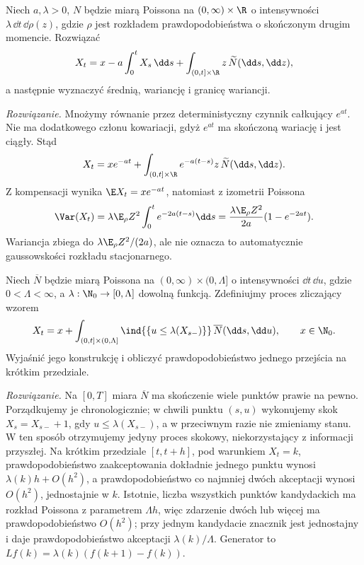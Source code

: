 \begin{zadanie}
Niech $a,\lambda>0$, $N$ będzie miarą Poissona na
$(0,\infty)\times\R$ o intensywności
$\lambda\,\dd t\,\dd\rho(z)$, gdzie $\rho$ jest
rozkładem prawdopodobieństwa o skończonym drugim momencie.
Rozwiązać
\[
 X_t=x-a\int_0^tX_s\,\dd s
 +\int_{(0,t]\times\R}z\,\widetilde N(\dd s,\dd z),
\]
a następnie wyznaczyć średnią, wariancję i granicę wariancji.

\emph{Rozwiązanie.} Mnożymy równanie przez deterministyczny
czynnik całkujący $e^{at}$. Nie ma dodatkowego członu
kowariacji, gdyż $e^{at}$ ma skończoną wariację i jest ciągły.
Stąd
\[
 X_t=xe^{-at}+\int_{(0,t]\times\R}
 e^{-a(t-s)}z\,\widetilde N(\dd s,\dd z).
\]
Z kompensacji wynika $\E X_t=xe^{-at}$, natomiast z
izometrii Poissona
\[
 \Var(X_t)=\lambda\E_\rho Z^2\int_0^te^{-2a(t-s)}\dd s
 =\frac{\lambda\E_\rho Z^2}{2a}(1-e^{-2at}).
\]
Wariancja zbiega do $\lambda\E_\rho Z^2/(2a)$, ale
nie oznacza to automatycznie gaussowskości rozkładu
stacjonarnego.
\end{zadanie}

\begin{zadanie}
Niech $\overline N$ będzie miarą Poissona na
$(0,\infty)\times(0,\Lambda]$ o intensywności
$\dd t\,\dd u$, gdzie $0<\Lambda<\infty$, a
$\lambda:\N_0\to[0,\Lambda]$ dowolną funkcją.
Zdefiniujmy proces zliczający wzorem
\[
 X_t=x+\int_{(0,t]\times(0,\Lambda]}
  \ind{\{u\le\lambda(X_{s-})\}}\,\overline N(\dd s,\dd u),
 \qquad x\in\N_0.
\]
Wyjaśnić jego konstrukcję i obliczyć prawdopodobieństwo
jednego przejścia na krótkim przedziale.

\emph{Rozwiązanie.} Na $[0,T]$ miara $\overline N$ ma
skończenie wiele punktów prawie na pewno. Porządkujemy
je chronologicznie; w chwili punktu $(s,u)$ wykonujemy skok
$X_s=X_{s-}+1$, gdy $u\le\lambda(X_{s-})$, a w przeciwnym
razie nie zmieniamy stanu. W ten sposób otrzymujemy
jedyny proces skokowy, niekorzystający z informacji przyszłej.
Na krótkim przedziale $[t,t+h]$, pod warunkiem $X_t=k$,
prawdopodobieństwo zaakceptowania dokładnie jednego punktu
wynosi $\lambda(k)h+O(h^2)$, a prawdopodobieństwo co najmniej
dwóch akceptacji wynosi $O(h^2)$, jednostajnie w $k$.
Istotnie, liczba wszystkich punktów kandydackich ma
rozkład Poissona z parametrem $\Lambda h$, więc zdarzenie
dwóch lub więcej ma prawdopodobieństwo $O(h^2)$; przy
jednym kandydacie znacznik jest jednostajny i daje
prawdopodobieństwo akceptacji $\lambda(k)/\Lambda$.
Generator to $Lf(k)=\lambda(k)(f(k+1)-f(k))$.
\end{zadanie}

